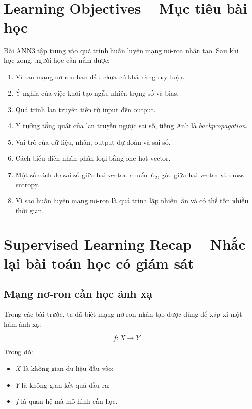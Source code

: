 

\section*{Learning Objectives -- Mục tiêu bài học}

Bài ANN3 tập trung vào quá trình huấn luyện mạng nơ-ron nhân tạo. Sau khi học xong, người học cần nắm được:

\begin{enumerate}[label=\arabic*.]
    \item Vì sao mạng nơ-ron ban đầu chưa có khả năng suy luận.
    \item Ý nghĩa của việc khởi tạo ngẫu nhiên trọng số và bias.
    \item Quá trình lan truyền tiến từ input đến output.
    \item Ý tưởng tổng quát của lan truyền ngược sai số, tiếng Anh là \textit{backpropagation}.
    \item Vai trò của dữ liệu, nhãn, output dự đoán và sai số.
    \item Cách biểu diễn nhãn phân loại bằng one-hot vector.
    \item Một số cách đo sai số giữa hai vector: chuẩn $L_2$, góc giữa hai vector và cross entropy.
    \item Vì sao huấn luyện mạng nơ-ron là quá trình lặp nhiều lần và có thể tốn nhiều thời gian.
\end{enumerate}

\section{Supervised Learning Recap -- Nhắc lại bài toán học có giám sát}

\subsection{Mạng nơ-ron cần học ánh xạ}

Trong các bài trước, ta đã biết mạng nơ-ron nhân tạo được dùng để xấp xỉ một hàm ánh xạ:

\[
    f: X \rightarrow Y
\]

Trong đó:

\begin{itemize}
    \item $X$ là không gian dữ liệu đầu vào;
    \item $Y$ là không gian kết quả đầu ra;
    \item $f$ là quan hệ mà mô hình cần học.
\end{itemize}

